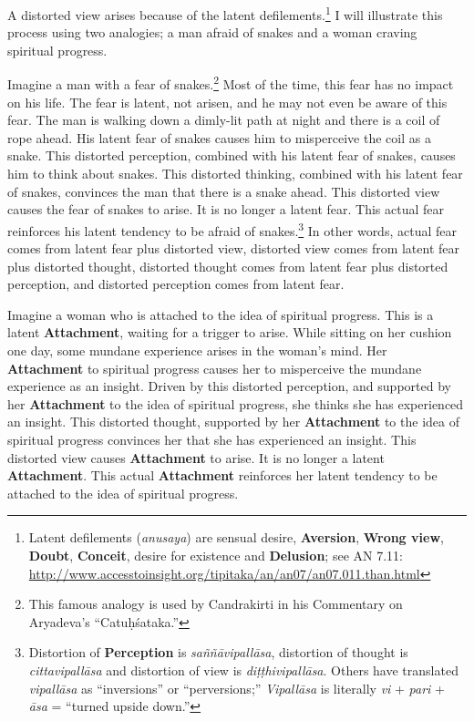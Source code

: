 A distorted view arises because of the latent defilements.\footnote{Latent defilements (\textit{anusaya}) are sensual desire, \textbf{Aversion}, \textbf{Wrong view}, \textbf{Doubt}, \textbf{Conceit}, desire for existence and \textbf{Delusion}; see AN 7.11: \url{http://www.accesstoinsight.org/tipitaka/an/an07/an07.011.than.html}} I will illustrate this process using two analogies; a man afraid of snakes and a woman craving spiritual progress.

\pagebreak

Imagine a man with a fear of snakes.\footnote{This famous analogy is used by Candrakirti in his Commentary on Aryadeva’s “Catuḥśataka.”} Most of the time, this fear has no impact on his life. The fear is latent, not arisen, and he may not even be aware of this fear. The man is walking down a dimly-lit path at night and there is a coil of rope ahead. His latent fear of snakes causes him to misperceive the coil as a snake. This distorted perception, combined with his latent fear of snakes, causes him to think about snakes. This distorted thinking, combined with his latent fear of snakes, convinces the man that there is a snake ahead. This distorted view causes the fear of snakes to arise. It is no longer a latent fear. This actual fear reinforces his latent tendency to be afraid of snakes.\footnote{Distortion of \textbf{Perception} is \textit{saññāvipallāsa}, distortion of thought is \textit{cittavipallāsa} and distortion of view is \textit{diṭṭhivipallāsa}. Others have translated \textit{vipallāsa} as “inversions” or “perversions;” \textit{Vipallāsa} is literally \textit{vi} + \textit{pari} + \textit{āsa} = “turned upside down.”} In other words, actual fear comes from latent fear plus distorted view, distorted view comes from latent fear plus distorted thought, distorted thought comes from latent fear plus distorted perception, and distorted perception comes from latent fear.

Imagine a woman who is attached to the idea of spiritual progress. This is a latent \textbf{Attachment}, waiting for a trigger to arise. While sitting on her cushion one day, some mundane experience arises in the woman’s mind. Her \textbf{Attachment} to spiritual progress causes her to misperceive the mundane experience as an insight. Driven by this distorted perception, and supported by her \textbf{Attachment} to the idea of spiritual progress, she thinks she has experienced an insight. This distorted thought, supported by her \textbf{Attachment} to the idea of spiritual progress convinces her that she has experienced an insight. This distorted view causes \textbf{Attachment} to arise. It is no longer a latent \textbf{Attachment}. This actual \textbf{Attachment} reinforces her latent tendency to be attached to the idea of spiritual progress.


